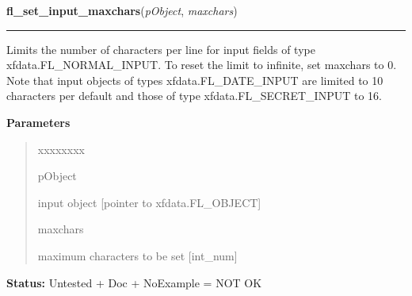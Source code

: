 \hspace{.8\funcindent}\begin{boxedminipage}{\funcwidth}

    \raggedright \textbf{fl\_set\_input\_maxchars}(\textit{pObject}, \textit{maxchars})

    \vspace{-1.5ex}

    \rule{\textwidth}{0.5\fboxrule}
\setlength{\parskip}{2ex}
    Limits the number of characters per line for input fields of type 
    xfdata.FL\_NORMAL\_INPUT. To reset the limit to infinite, set maxchars 
    to 0. Note that input objects of types xfdata.FL\_DATE\_INPUT are 
    limited to 10 characters per default and those of type 
    xfdata.FL\_SECRET\_INPUT to 16.

\setlength{\parskip}{1ex}
      \textbf{Parameters}
      \vspace{-1ex}

      \begin{quote}
        \begin{Ventry}{xxxxxxxx}

          \item[pObject]

          input object [pointer to xfdata.FL\_OBJECT]

          \item[maxchars]

          maximum characters to be set [int\_num]

        \end{Ventry}

      \end{quote}

\textbf{Status:} Untested + Doc + NoExample = NOT OK



    \end{boxedminipage}

    \label{xformslib:library:fl_set_input_format}

    \vspace{0.5ex}

